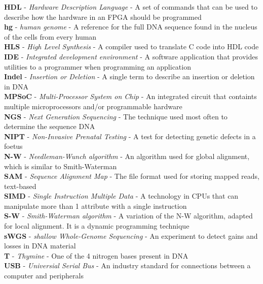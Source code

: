 \textbf{HDL} - \textit{Hardware Description Language} - A set of commands that can be used to describe how the hardware in an FPGA should be programmed \\
\textbf{hg} - \textit{human genome} - A reference for the full DNA sequence found in the nucleus of the cells from every human \\
\textbf{HLS} - \textit{High Level Synthesis} - A compiler used to translate C code into HDL code \\
\textbf{IDE} - \textit{Integrated development environment} - A software application that provides utilities to a programmer when programming an application \\
\textbf{Indel} - \textit{Insertion or Deletion} - A single term to describe an insertion or deletion in DNA \\
\textbf{MPSoC} - \textit{Multi-Processor System on Chip} - An integrated circuit that containts multiple microprocessors and/or programmable hardware \\
\textbf{NGS} - \textit{Next Generation Sequencing} - The technique used most often to determine the sequence DNA \\
\textbf{NIPT} - \textit{Non-Invasive Prenatal Testing} - A test for detecting genetic defects in a foetus \\
\textbf{N-W } - \textit{Needleman-Wunch algorithm} - An algorithm used for global alignment, which is similar to Smith-Waterman \\
\textbf{SAM} - \textit{Sequence Alignment Map} - The file format used for storing mapped reads, text-based \\
\textbf{SIMD} - \textit{Single Instruction Multiple Data} - A technology in CPUs that can manipulate more than 1 attribute with a single instruction \\
\textbf{S-W} - \textit{Smith-Waterman algorithm} - A variation of the N-W algorithm, adapted for local alignment. It is a dynamic programming technique \\
\textbf{sWGS} - \textit{shallow Whole-Genome Sequencing} - An experiment to detect gains and losses in DNA material \\
\textbf{T} - \textit{Thymine} - One of the 4 nitrogen bases present in DNA \\
\textbf{USB} - \textit{Universial Serial Bus} - An industry standard for connections between a computer and peripherals \\

